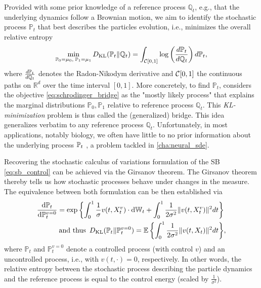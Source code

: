 Provided with some prior knowledge of a reference process $\mathbb{Q}_t$, e.g., that the underlying dynamics follow a Brownian motion, we aim to identify the stochastic process $\mathbb{P}_t$ that best describes the particles evolution, i.e., minimizes the overall relative entropy
\begin{equation}
	\label{eq:schrodinger_bridge}
	\min_{ \substack{ \mathbb{P}_{{0}} = \mu_0, \; \mathbb{P}_{{1}} = \mu_1} } D_{\mathrm{KL}}(\mathbb{P}_{{t}} \| \mathbb{Q}_{ t }) = \int_{{\mathcal{C}}[0,1]} \log \left( \frac{d\mathbb{P}_{{t}}}{d \mathbb{Q}_{ t }} \right) d\mathbb{P}_{{t}},
\end{equation}
where $\frac{d\mathbb{P}_{{t}}}{d\mathbb{Q}_{ t }}$ denotes the Radon-Nikodym derivative and ${\mathcal{C}}[0,1]$ the continuous paths on $\mathbb{R}^d$ over the time interval $[0, 1]$.
More concretely, to find $\mathbb{P}_t$, \citet{schrodinger1931umkehrung, schrodinger1932theorie} considers the objective \eqref{eq:schrodinger_bridge} as the "mostly likely process" that explains the marginal distributions $\mathbb{P}_0, \mathbb{P}_1$ relative to reference process $\mathbb{Q}_t$.
This \emph{KL-minimization} problem is thus called the (generalized) \citeauthor{schrodinger1931umkehrung} bridge.
This idea generalizes verbatim to any reference process $\mathbb{Q}_t$. Unfortunately, in most applications, notably biology, we often have little to no prior information about the underlying process $\mathbb{P}_{{t}}$ \citep{liberali2014hierarchical}, a problem tackled in \cref{cha:neural_sde}.

Recovering the stochastic calculus of variations formulation of the \acrlong{SB} \eqref{eq:sb_control} can be achieved via the Girsanov theorem. The Girsanov theorem thereby tells us how stochastic processes behave under changes in the measure. The equivalence between both formulation can be then established via
\begin{align*}
	\frac{\mathrm{d}\mathbb{P}_{t}}{\mathrm{d} \mathbb{P}^{v=0}_t} = \exp \left\{ \int_0^1 \frac{1}{\sigma} v(t, X_t^v) \cdot \mathrm{d} \mathbb{W}_t +  \int_0^1 \frac{1}{2\sigma^2} \lVert v(t, X_t^v)\rVert^2 dt \right\}& \\
	\text{and thus} \enspace D_{\mathrm{KL}}(\mathbb{P}_{t} \| \mathbb{P}^{v=0}_t) = \mathbb{E} \left\{ \int_0^1 \frac{1}{2\sigma^2}\lVert v(t, X_t)\rVert^2 dt \right\}& ,
\end{align*}
where $\mathbb{P}_t$ and $\mathbb{P}^{v=0}_t$ denote a controlled process (with control $v$) and an uncontrolled process, i.e., with $v(t, \cdot)=0$, respectively.
In other words, the relative entropy between the stochastic process describing the particle dynamics and the reference process is equal to the control energy (scaled by $\frac{1}{\sigma^2}$).

